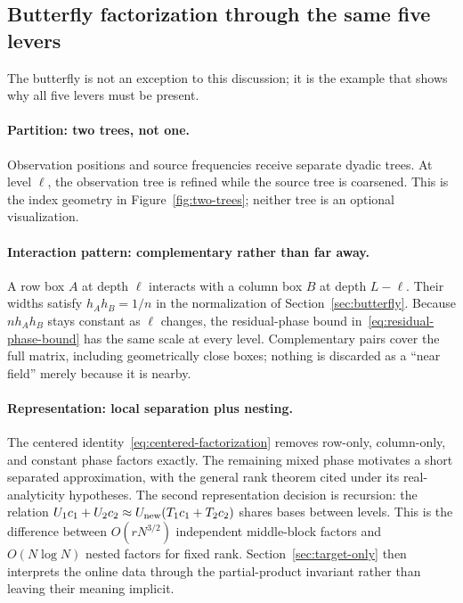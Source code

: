 \documentclass[11pt,a4paper]{article}
\begin{document}
\subsection{Butterfly factorization through the same five levers}
\label{sec:butterfly-levers}
The butterfly is not an exception to this discussion; it is the example that shows why all five levers must be present.

\paragraph{Partition: two trees, not one.} Observation positions and source frequencies receive separate dyadic trees. At level $\ell$, the observation tree is refined while the source tree is coarsened. This is the index geometry in Figure~\ref{fig:two-trees}; neither tree is an optional visualization.

\paragraph{Interaction pattern: complementary rather than far away.} A row box $A$ at depth $\ell$ interacts with a column box $B$ at depth $L-\ell$. Their widths satisfy $h_Ah_B=1/n$ in the normalization of Section~\ref{sec:butterfly}. Because $n h_Ah_B$ stays constant as $\ell$ changes, the residual-phase bound in~\eqref{eq:residual-phase-bound} has the same scale at every level. Complementary pairs cover the full matrix, including geometrically close boxes; nothing is discarded as a ``near field'' merely because it is nearby.

\paragraph{Representation: local separation plus nesting.} The centered identity~\eqref{eq:centered-factorization} removes row-only, column-only, and constant phase factors exactly. The remaining mixed phase motivates a short separated approximation, with the general rank theorem cited under its real-analyticity hypotheses. The second representation decision is recursion: the relation $U_1c_1+U_2c_2\approx U_{\rm new}(T_1c_1+T_2c_2)$ shares bases between levels. This is the difference between $O(rN^{3/2})$ independent middle-block factors and $O(N\log N)$ nested factors for fixed rank. Section~\ref{sec:target-only} then interprets the online data through the partial-product invariant rather than leaving their meaning implicit.
\end{document}
